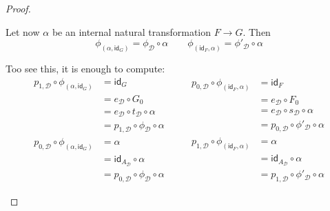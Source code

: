 \documentclass[a4paper,UKenglish,cleveref,pdftex,thm-restate,numberwithinsect]{lipics-v2021}
\newcommand{\id}[1]{\mathsf{id}_{#1}}
\begin{document}
\begin{proof}
\begin{enumerate}
\begin{itemize}
				Let now $\alpha$ be an internal natural transformation $F\to G$. Then
				\[\phi_{(\alpha, \id{G})}= \phi_{\mathcal{D}}\circ \alpha \qquad \phi_{(\id{F}, \alpha)}= \phi'_{\mathcal{D}}\circ \alpha\]
				
				Too see this, it is enough to compute:
				\[\begin{split}
					p_{1, \mathcal{D}}\circ \phi_{(\alpha, \id{G})}&= \id{G}\\&=e_{\mathcal{D}}\circ G_0						\\&=e_{\mathcal{D}}\circ t_{\mathcal{D}}\circ \alpha 
					\\&=p_{1, \mathcal{D}}\circ \phi_{\mathcal{D}}\circ \alpha
				\end{split} \qquad \begin{split}
					p_{0, \mathcal{D}}\circ \phi_{(\id{F}, \alpha)}&=\id{F}\\&=e_{\mathcal{D}}\circ F_0
					\\&=e_{\mathcal{D}}\circ s_{\mathcal{D}} \circ \alpha 
					\\&=p_{0, \mathcal{D}}\circ \phi'_{\mathcal{D}}\circ \alpha
				\end{split}\]
				\[\begin{split}
					p_{0, \mathcal{D}}\circ \phi_{(\alpha, \id{G})}&=\alpha 					\\&=\id{A_{\mathcal{D}}}\circ \alpha
					\\&= p_{0, \mathcal{D}}\circ \phi_{\mathcal{D}}\circ \alpha
				\end{split} \qquad \begin{split}
				p_{1, \mathcal{D}}\circ \phi_{(\id{F}, \alpha)}&=\alpha 					\\&=\id{A_{\mathcal{D}}}\circ \alpha
				\\&= p_{1, \mathcal{D}}\circ \phi'_{\mathcal{D}}\circ \alpha
				\end{split}\]
				

\end{itemize}
\end{enumerate}
\end{proof}
\end{document}
